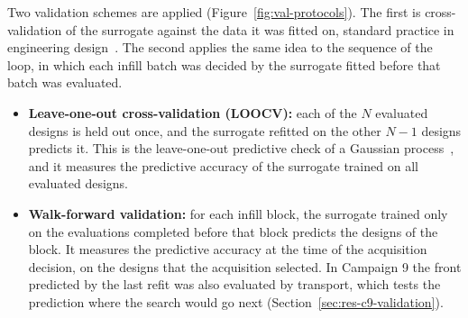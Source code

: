 Two validation schemes are applied (Figure~\ref{fig:val-protocols}).
The first is cross-validation of the surrogate against the data it was
fitted on, standard practice in engineering
design~\cite{forrester_book_2008}. The second applies the same idea to
the sequence of the loop, in which each infill batch was decided by the
surrogate fitted before that batch was evaluated.

\begin{itemize}
  \item \textbf{Leave-one-out cross-validation (LOOCV):} each of the $N$
        evaluated designs is held out once, and the surrogate refitted on
        the other $N-1$ designs predicts it. This is the leave-one-out
        predictive check of a Gaussian process~\cite{rasmussen_gp_2006},
        and it measures the predictive accuracy of the surrogate trained
        on all evaluated designs.

  \item \textbf{Walk-forward validation:} for each infill block, the
        surrogate trained only on the evaluations completed before that
        block predicts the designs of the block. It measures the
        predictive accuracy at the time of the acquisition decision, on
        the designs that the acquisition selected. In Campaign 9 the
        front predicted by the last refit was also evaluated by
        transport, which tests the prediction where the search would go
        next (Section~\ref{sec:res-c9-validation}).
\end{itemize}


